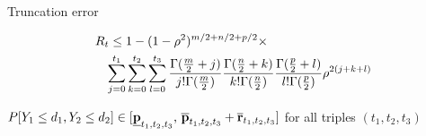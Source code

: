 \documentclass{slides}
\begin{document}
\begin{slide}

Truncation error

\begin{eqnarray*}
\lefteqn{ R_t \leq 1- (1-\rho^2)^{m/2 + n/2 + p/2} \times } \\
   & & \sum_{j=0}^{t_1} \sum_{k=0}^{t_2} \sum_{l=0}^{t_3} 
   \frac{\Gamma (\frac{m}{2}+j)}{ j! \Gamma (\frac{m}{2}) }
   \frac{\Gamma (\frac{n}{2}+k)}{ k! \Gamma (\frac{n}{2}) }
   \frac{\Gamma (\frac{p}{2}+l)}{ l! \Gamma (\frac{p}{2}) }
   \rho^{2(j +k +l)} 
\end{eqnarray*}

$P[Y_1 \leq d_1, Y_2 \leq d_2] \in
 [ \underline{\bf p}_{t_1,t_2,t_3} , \,
	 \overline{\bf p}_{t_1,t_2, t_3} + \overline{\bf r}_{t_1,t_2, t_3}]$ 
for all triples $(t_1,t_2, t_3)$
\end{slide}

\end{document}

